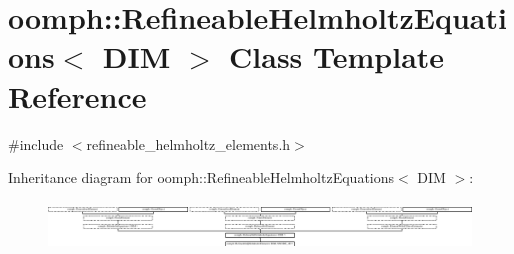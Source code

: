 \hypertarget{classoomph_1_1RefineableHelmholtzEquations}{}\section{oomph\+:\+:Refineable\+Helmholtz\+Equations$<$ D\+IM $>$ Class Template Reference}
\label{classoomph_1_1RefineableHelmholtzEquations}


{\ttfamily \#include $<$refineable\+\_\+helmholtz\+\_\+elements.\+h$>$}

Inheritance diagram for oomph\+:\+:Refineable\+Helmholtz\+Equations$<$ D\+IM $>$\+:\begin{figure}[H]
\begin{center}
\leavevmode
\includegraphics[height=1.314554cm]{classoomph_1_1RefineableHelmholtzEquations}
\end{center}
\end{figure}
